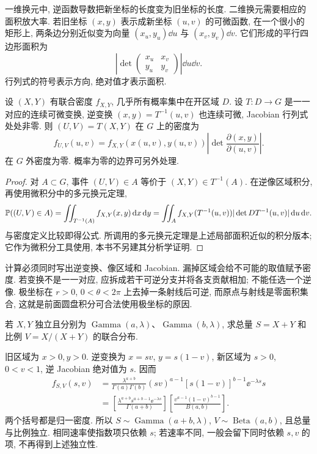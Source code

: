 
一维换元中, 逆函数导数把新坐标的长度变为旧坐标的长度. 二维换元需要相应的面积放大率. 若旧坐标 $(x,y)$ 表示成新坐标 $(u,v)$ 的可微函数, 在一个很小的矩形上, 两条边分别近似变为向量
$(x_u,y_u)\dd u$ 与 $(x_v,y_v)\dd v$. 它们形成的平行四边形面积为
\[
 \left|\det\begin{pmatrix}x_u&x_v\\y_u&y_v\end{pmatrix}\right|
      \dd u\dd v.
\]
行列式的符号表示方向, 绝对值才表示面积.

\begin{theorem}[二维密度换元]
设 $(X,Y)$ 有联合密度 $f_{X,Y}$, 几乎所有概率集中在开区域 $D$. 设 $T:D\to G$ 是一一对应的连续可微变换, 逆变换 $(x,y)=T^{-1}(u,v)$ 也连续可微, Jacobian 行列式处处非零. 则 $(U,V)=T(X,Y)$ 在 $G$ 上的密度为
\[
 f_{U,V}(u,v)=f_{X,Y}(x(u,v),y(u,v))
       \left|\det\frac{\partial(x,y)}{\partial(u,v)}\right|.
\]
在 $G$ 外密度为零. 概率为零的边界可另外处理.
\end{theorem}
\begin{proof}
对 $A\subset G$, 事件 $(U,V)\in A$ 等价于 $(X,Y)\in T^{-1}(A)$. 在逆像区域积分, 再使用微积分中的多元换元定理,
\[
 \mathbb P((U,V)\in A)=\iint_{T^{-1}(A)}f_{X,Y}(x,y)\,\mathrm d x\,\mathrm d y
 =\iint_A f_{X,Y}(T^{-1}(u,v))|\det DT^{-1}(u,v)|\,\mathrm d u\,\mathrm d v.
\]
与密度定义比较即得公式. 所调用的多元换元定理是上述局部面积近似的积分版本; 它作为微积分工具使用, 本书不另建其分析学证明.
\end{proof}

计算必须同时写出逆变换、像区域和 Jacobian. 漏掉区域会给不可能的取值赋予密度. 若变换不是一一对应, 应拆成若干可逆分支并将各支贡献相加; 不能任选一个逆像. 极坐标在 $r>0$, $0<\theta<2\pi$ 上去掉一条射线后可逆, 而原点与射线是零面积集合, 这就是前面圆盘积分可合法使用极坐标的原因.

\begin{example}
若 $X,Y$ 独立且分别为 $\operatorname{Gamma}(a,\lambda)$、$\operatorname{Gamma}(b,\lambda)$, 求总量 $S=X+Y$ 和比例 $V=X/(X+Y)$ 的联合分布.
\end{example}
\begin{solution}
旧区域为 $x>0,y>0$. 逆变换为 $x=sv$, $y=s(1-v)$, 新区域为 $s>0$, $0<v<1$, 逆 Jacobian 绝对值为 $s$. 因而
\begin{align*}
 f_{S,V}(s,v)
 &=\frac{\lambda^{a+b}}{\Gamma(a)\Gamma(b)}
     (sv)^{a-1}[s(1-v)]^{b-1}\ee^{-\lambda s}s\\
 &=\left[\frac{\lambda^{a+b}s^{a+b-1}\ee^{-\lambda s}}{\Gamma(a+b)}\right]
   \left[\frac{v^{a-1}(1-v)^{b-1}}{B(a,b)}\right].
\end{align*}
两个括号都是归一密度. 所以 $S\sim\operatorname{Gamma}(a+b,\lambda)$,
$V\sim\operatorname{Beta}(a,b)$, 且总量与比例独立. 相同速率使指数项只依赖 $s$; 若速率不同, 一般会留下同时依赖 $s,v$ 的项, 不再得到上述独立性.
\end{solution}

